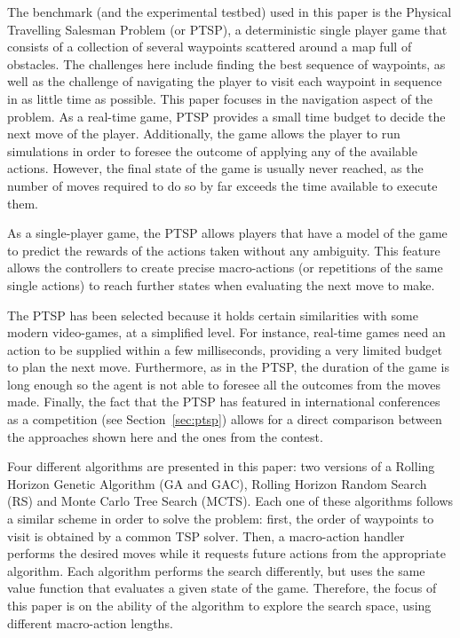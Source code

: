 \documentclass{sig-alternate}
\begin{document}
The benchmark (and the experimental testbed) used in this paper is the Physical Travelling Salesman Problem (or PTSP), a deterministic single player game that consists of a collection of several waypoints scattered around a map full of obstacles. The challenges here include finding the best sequence of waypoints, as well as the challenge of navigating the player to visit each waypoint in sequence in as little time as possible. This paper focuses in the navigation aspect of the problem. As a real-time game, PTSP provides a small time budget to decide the next move of the player. Additionally, the game allows the player to run simulations in order to foresee the outcome of applying any of the available actions. However, the final state of the game is usually never reached, as the number of moves required to do so by far exceeds the time available to execute them.

As a single-player game, the PTSP allows players that have a model of the game to predict the rewards of the actions taken without any ambiguity. This feature allows the controllers to create precise macro-actions (or repetitions of the same single actions) to reach further states when evaluating the next move to make.

The PTSP has been selected because it holds certain similarities with some modern video-games, at a simplified level. For instance, real-time games need an action to be supplied within a few milliseconds, providing a very limited budget to plan the next move. Furthermore, as in the PTSP, the duration of the game is long enough so the agent is not able to foresee all the outcomes from the moves made. Finally, the fact that the PTSP has featured in international conferences as a competition (see Section~\ref{sec:ptsp}) allows for a direct comparison between the approaches shown here and the ones from the contest.

Four different algorithms are presented in this paper: two versions of a Rolling Horizon Genetic Algorithm (GA and GAC), Rolling Horizon Random Search (RS) and Monte Carlo Tree Search (MCTS). Each one of these algorithms follows a similar scheme in order to solve the problem: first, the order of waypoints to visit is obtained by a common TSP solver. Then, a macro-action handler performs the desired moves while it requests future actions from the appropriate algorithm. Each algorithm performs the search differently, but uses the same value function that evaluates a given state of the game. Therefore, the focus of this paper is on the ability of the algorithm to explore the search space, using different macro-action lengths.
\end{document}
